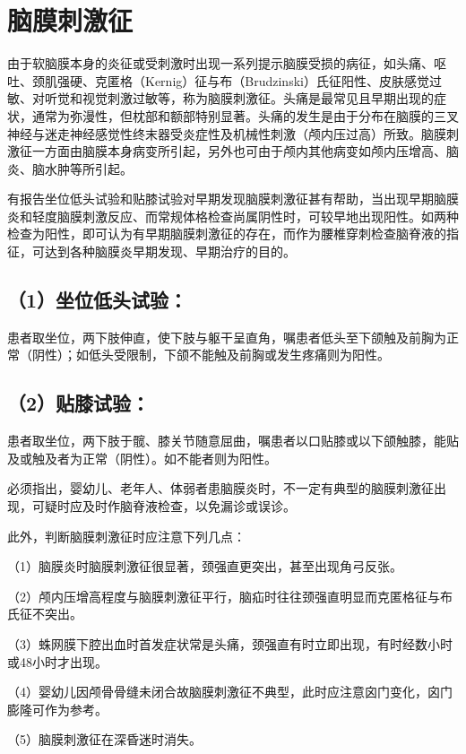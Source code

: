 \chapter{脑膜刺激征}

由于软脑膜本身的炎征或受刺激时出现一系列提示脑膜受损的病征，如头痛、呕吐、颈肌强硬、克匿格（Kernig）征与布（Brudzinski）氏征阳性、皮肤感觉过敏、对听觉和视觉刺激过敏等，称为脑膜刺激征。头痛是最常见且早期出现的症状，通常为弥漫性，但枕部和额部特别显著。头痛的发生是由于分布在脑膜的三叉神经与迷走神经感觉性终末器受炎症性及机械性刺激（颅内压过高）所致。脑膜刺激征一方面由脑膜本身病变所引起，另外也可由于颅内其他病变如颅内压增高、脑炎、脑水肿等所引起。

有报告坐位低头试验和贴膝试验对早期发现脑膜刺激征甚有帮助，当出现早期脑膜炎和轻度脑膜刺激反应、而常规体格检查尚属阴性时，可较早地出现阳性。如两种检查为阳性，即可认为有早期脑膜刺激征的存在，而作为腰椎穿刺检查脑脊液的指征，可达到各种脑膜炎早期发现、早期治疗的目的。

\section{（1）坐位低头试验：}

患者取坐位，两下肢伸直，使下肢与躯干呈直角，嘱患者低头至下颌触及前胸为正常（阴性）；如低头受限制，下颌不能触及前胸或发生疼痛则为阳性。

\section{（2）贴膝试验：}

患者取坐位，两下肢于髋、膝关节随意屈曲，嘱患者以口贴膝或以下颌触膝，能贴及或触及者为正常（阴性）。如不能者则为阳性。

必须指出，婴幼儿、老年人、体弱者患脑膜炎时，不一定有典型的脑膜刺激征出现，可疑时应及时作脑脊液检查，以免漏诊或误诊。

此外，判断脑膜刺激征时应注意下列几点：

（1）脑膜炎时脑膜刺激征很显著，颈强直更突出，甚至出现角弓反张。

（2）颅内压增高程度与脑膜刺激征平行，脑疝时往往颈强直明显而克匿格征与布氏征不突出。

（3）蛛网膜下腔出血时首发症状常是头痛，颈强直有时立即出现，有时经数小时或48小时才出现。

（4）婴幼儿因颅骨骨缝未闭合故脑膜刺激征不典型，此时应注意囟门变化，囟门膨隆可作为参考。

（5）脑膜刺激征在深昏迷时消失。

